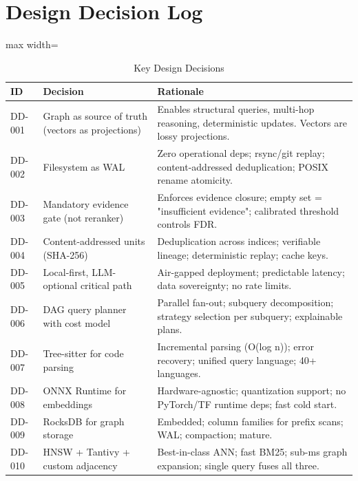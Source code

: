 ﻿%

\section{Design Decision Log}
\label{app:decisions}

\begin{table}[htbp]
\centering
\caption{Key Design Decisions}
\label{tab:decisions}
\begin{adjustbox}{max width=\textwidth}
\begin{tabular}{llp{6cm}}
\toprule
\textbf{ID} & \textbf{Decision} & \textbf{Rationale} \\
\midrule
DD-001 & Graph as source of truth (vectors as projections) & Enables structural queries, multi-hop reasoning, deterministic updates. Vectors are lossy projections. \\
DD-002 & Filesystem as WAL & Zero operational deps; rsync/git replay; content-addressed deduplication; POSIX rename atomicity. \\
DD-003 & Mandatory evidence gate (not reranker) & Enforces evidence closure; empty set = "insufficient evidence"; calibrated threshold controls FDR. \\
DD-004 & Content-addressed units (SHA-256) & Deduplication across indices; verifiable lineage; deterministic replay; cache keys. \\
DD-005 & Local-first, LLM-optional critical path & Air-gapped deployment; predictable latency; data sovereignty; no rate limits. \\
DD-006 & DAG query planner with cost model & Parallel fan-out; subquery decomposition; strategy selection per subquery; explainable plans. \\
DD-007 & Tree-sitter for code parsing & Incremental parsing (O(log n)); error recovery; unified query language; 40+ languages. \\
DD-008 & ONNX Runtime for embeddings & Hardware-agnostic; quantization support; no PyTorch/TF runtime deps; fast cold start. \\
DD-009 & RocksDB for graph storage & Embedded; column families for prefix scans; WAL; compaction; mature. \\
DD-010 & HNSW + Tantivy + custom adjacency & Best-in-class ANN; fast BM25; sub-ms graph expansion; single query fuses all three. \\

\end{tabular}
\end{adjustbox}
\end{table}
